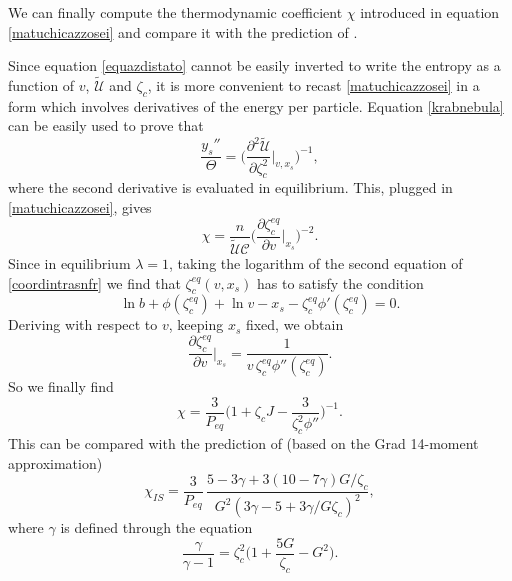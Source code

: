 \documentclass[useAMS,usenatbib,prd,twocolumn,nofootinbib]{revtex4-1}
\begin{document}
We can finally compute the thermodynamic coefficient $\chi$ introduced in equation \eqref{matuchicazzosei} and compare it with the prediction of \cite{Israel_Stewart_1979}.

Since equation \eqref{equazdistato} cannot be easily inverted to write the entropy as a function of $v$, $\tilde{\mathcal{U}}$ and $\zeta_c$, it is more convenient to recast \eqref{matuchicazzosei} in a form which involves derivatives of the energy per particle. Equation \eqref{krabnebula} can be easily used to prove that
\begin{equation}
\dfrac{y_s''}{\Theta} = \bigg( \dfrac{\partial^2 \tilde{\mathcal{U}}}{\partial \zeta_c^2} \bigg|_{v,x_s} \bigg)^{-1},
\end{equation}
where the second derivative is evaluated in equilibrium. This, plugged in \eqref{matuchicazzosei}, gives
\begin{equation}\label{berghione}
\chi = \dfrac{n}{\tilde{\mathcal{U}} \mathcal{C}} \bigg( \dfrac{\partial \zeta_c^{eq}}{\partial v} \bigg|_{x_s} \bigg)^{-2} .
\end{equation}
Since in equilibrium $\lambda=1$, taking the logarithm of the second equation of \eqref{coordintrasnfr} we find that $\zeta_c^{eq}(v,x_s)$ has to satisfy the condition
\begin{equation}
\ln b + \phi(\zeta_c^{eq}) + \ln v -x_s - \zeta_c^{eq} \phi'(\zeta_c^{eq}) =0.
\end{equation} 
Deriving with respect to $v$, keeping $x_s$ fixed, we obtain
\begin{equation}
\dfrac{\partial \zeta_c^{eq}}{\partial v}  \bigg|_{x_s} = \dfrac{1}{v \, \zeta_c^{eq} \phi''(\zeta_c^{eq})} .
\end{equation}
So we finally find
\begin{equation}
\chi = \dfrac{3}{P_{eq}} \bigg( 1+ \zeta_c J - \dfrac{3}{\zeta_c^2 \phi''} \bigg)^{-1} .
\end{equation}
This can be compared with the prediction of \citet{Israel_Stewart_1979} (based on the Grad 14-moment approximation)
\begin{equation}
\chi_{IS} = \dfrac{3}{P_{eq}} \, \dfrac{5 - 3 \gamma + 3(10-7\gamma)G/\zeta_c}{G^2 (3\gamma -5 +3\gamma/G \zeta_c)^2},
\end{equation}
where $\gamma$ is defined through the equation
\begin{equation}
\dfrac{\gamma}{\gamma -1} = \zeta_c^2 \bigg( 1 + \dfrac{5G}{\zeta_c} -G^2 \bigg).
\end{equation}
\end{document}
